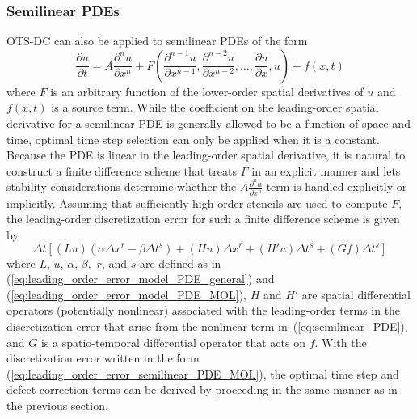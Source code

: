 \documentclass[fleqn,12pt,twoside]{article}
\newcommand{\beq}{\begin{equation}}
\newcommand{\eeq}{\end{equation}}
\def\dt{\Delta t}
\def\dx{\Delta x}
\begin{document}
\subsubsection*{Semilinear PDEs}
OTS-DC can also be applied to semilinear PDEs of the form
\beq
  \frac{\partial u}{\partial t} = A \frac{\partial^n u}{\partial x^n}
  + F \left( \frac{\partial^{n-1} u}{\partial x^{n-1}},
      \frac{\partial^{n-2} u}{\partial x^{n-2}}, \ldots,
      \frac{\partial u}{\partial x}, u \right)
  + f(x,t)
  \label{eq:semilinear_PDE}
\eeq
where $F$ is an arbitrary function of the lower-order spatial derivatives
of $u$ and $f(x,t)$ is a source term.  While the coefficient on the 
leading-order spatial derivative for a semilinear PDE is generally allowed 
to be a function of space and time, optimal time step selection can only be 
applied when it is a constant.  Because the PDE is linear in the leading-order 
spatial derivative, it is natural to construct a finite difference scheme that 
treats $F$ in an explicit manner and lets stability considerations determine 
whether the $A \frac{\partial^n u}{\partial x^n}$ term is handled explicitly or 
implicitly.  Assuming that sufficiently high-order stencils are used to 
compute $F$, the leading-order discretization error for such a finite 
difference scheme is given by
\beq
  \dt \left[ (L u) (\alpha \dx^r - \beta \dt^s) 
  + \left( H u \right) \dx^r 
  + \left( H' u \right) \dt^s
  + (G f) \dt^s \right]
  \label{eq:leading_order_error_semilinear_PDE_MOL}
\eeq
where $L$, $u$, $\alpha$, $\beta,$ $r$, and $s$ are defined as in
(\ref{eq:leading_order_error_model_PDE_general}) and
(\ref{eq:leading_order_error_model_PDE_MOL}), $H$ and $H'$ are spatial 
differential operators (potentially nonlinear) associated with the 
leading-order terms in the discretization error that arise from the nonlinear 
term in~(\ref{eq:semilinear_PDE}), and $G$ is a spatio-temporal differential 
operator that acts on $f$.  With the discretization error written in the 
form (\ref{eq:leading_order_error_semilinear_PDE_MOL}), the optimal time 
step and defect correction terms can be derived by proceeding in the same 
manner as in the previous section.
\end{document}
